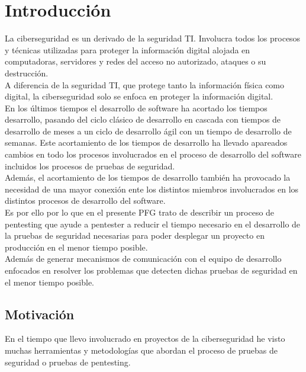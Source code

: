 \chapter{Introducción}

La ciberseguridad es un derivado de la seguridad TI. Involucra todos los procesos y técnicas utilizadas para proteger 
la información digital alojada en computadoras, servidores y redes del acceso no autorizado, ataques o su destrucción.\\

A diferencia de la seguridad TI, que protege tanto la información física como digital, la ciberseguridad 
solo se enfoca en proteger la información digital.\\

En los últimos tiempos el desarrollo de software ha acortado los tiempos  desarrollo, pasando del ciclo clásico de desarrollo 
en cascada con tiempos de desarrollo de meses a un ciclo de desarrollo ágil con un tiempo de desarrollo de semanas. Este acortamiento 
de los tiempos de desarrollo ha llevado apareados cambios en todo los procesos involucrados en el proceso de desarrollo del 
software incluidos los procesos de pruebas de seguridad.\\

Además, el acortamiento de los tiempos de desarrollo también ha provocado la necesidad de una mayor conexión 
ente los distintos miembros involucrados en los distintos procesos de desarrollo del software.\\ 

Es por ello por lo que en el presente PFG trato de describir un proceso de pentesting que ayude a pentester a reducir 
el tiempo necesario en el desarrollo de la pruebas de seguridad necesarias para poder desplegar un proyecto en producción 
en el menor tiempo posible.\\ 

Además de generar mecanismos de comunicación con el equipo de desarrollo enfocados en resolver los problemas que detecten 
dichas pruebas de seguridad en el menor tiempo posible.\\

\newpage
\section{Motivación}

En el tiempo que llevo involucrado en proyectos de la ciberseguridad he visto muchas herramientas y metodologías que abordan 
el proceso de pruebas de seguridad o pruebas de pentesting.\\

